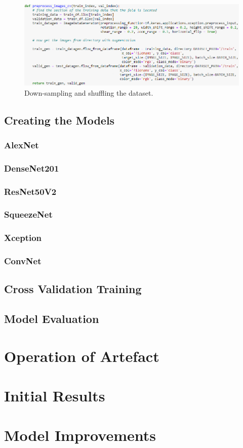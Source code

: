 \begin{figure}[H]
    \centering
    \includegraphics[width=\textwidth]{figures/image-preprocessing.png}
    \caption{Down-sampling and shuffling the dataset.}
    \label{fig:image-preprocessing}
\end{figure}

\subsection{Creating the Models}

\subsubsection{AlexNet}


\subsubsection{DenseNet201}


\subsubsection{ResNet50V2}


\subsubsection{SqueezeNet}


\subsubsection{Xception}


\subsubsection{ConvNet}


\subsection{Cross Validation Training}


\subsection{Model Evaluation}


\section{Operation of Artefact}

\section{Initial Results}

\section{Model Improvements}

